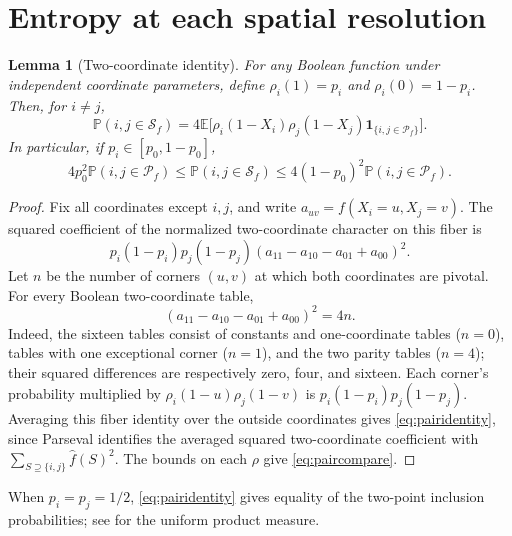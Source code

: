 \documentclass[11pt]{amsart}
\newtheorem{lemma}[theorem]{Lemma}
\theoremstyle{remark}
\newcommand{\Prob}{\mathbb P}
\newcommand{\E}{\mathbb E}
\newcommand{\one}{\mathbf 1}
\newcommand{\cS}{\mathcal S}
\newcommand{\cP}{\mathcal P}
\begin{document}
\section{Entropy at each spatial resolution}\label{sec:mesoscopic}

\begin{lemma}[Two-coordinate identity]\label{lem:biasedpair}
For any Boolean function under independent coordinate parameters, define $\rho_i(1)=p_i$ and $\rho_i(0)=1-p_i$. Then, for $i\ne j$,
\begin{equation}\label{eq:pairidentity}
 \Prob(i,j\in\cS_f)=4\E\bigl[\rho_i(1-X_i)\rho_j(1-X_j)
                         \one_{\{i,j\in\cP_f\}}\bigr].
\end{equation}
In particular, if $p_i\in[p_0,1-p_0]$,
\begin{equation}\label{eq:paircompare}
 4p_0^2\Prob(i,j\in\cP_f)
 \le\Prob(i,j\in\cS_f)
 \le4(1-p_0)^2\Prob(i,j\in\cP_f).
\end{equation}
\end{lemma}
\begin{proof}
Fix all coordinates except $i,j$, and write $a_{uv}=f(X_i=u,X_j=v)$. The squared coefficient of the normalized two-coordinate character on this fiber is
\[
 p_i(1-p_i)p_j(1-p_j)
 (a_{11}-a_{10}-a_{01}+a_{00})^2.
\]
Let $n$ be the number of corners $(u,v)$ at which both coordinates are pivotal. For every Boolean two-coordinate table,
\[
 (a_{11}-a_{10}-a_{01}+a_{00})^2=4n.
\]
Indeed, the sixteen tables consist of constants and one-coordinate tables ($n=0$), tables with one exceptional corner ($n=1$), and the two parity tables ($n=4$); their squared differences are respectively zero, four, and sixteen. Each corner's probability multiplied by $\rho_i(1-u)\rho_j(1-v)$ is $p_i(1-p_i)p_j(1-p_j)$. Averaging this fiber identity over the outside coordinates gives \eqref{eq:pairidentity}, since Parseval identifies the averaged squared two-coordinate coefficient with $\sum_{S\supseteq\{i,j\}}\widehat f(S)^2$. The bounds on each $\rho$ give \eqref{eq:paircompare}.
\end{proof}

When $p_i=p_j=1/2$, \eqref{eq:pairidentity} gives equality of the two-point inclusion probabilities; see \cite[equation~(2.13)]{GPS} for the uniform product measure.
\end{document}
